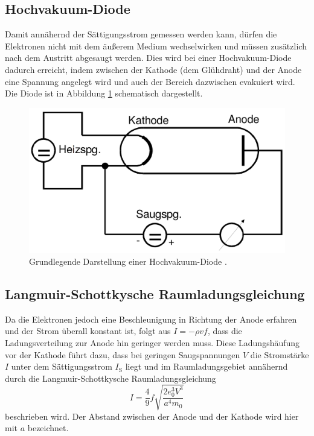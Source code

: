 \subsection{Hochvakuum-Diode}
Damit annähernd der Sättigungsstrom gemessen werden kann, dürfen die Elektronen nicht mit dem äußerem Medium wechselwirken und müssen zusätzlich nach dem Austritt abgesaugt werden. Dies wird bei einer Hochvakuum-Diode dadurch erreicht, indem zwischen der Kathode (dem Glühdraht) und der Anode eine Spannung angelegt wird und auch der Bereich dazwischen evakuiert wird. Die Diode ist in Abbildung \ref{fig:Hochvakuum-Diode} schematisch dargestellt.
\begin{figure}
	\centering
	\includegraphics[width=\linewidth-150pt,height=\textheight-150pt,keepaspectratio]{content/Bilder/Hochvakuum-Diode.png}
	\caption{Grundlegende Darstellung einer Hochvakuum-Diode \cite{V504}.}
	\label{fig:Hochvakuum-Diode}
\end{figure}

\subsection{Langmuir-Schottkysche Raumladungsgleichung}
Da die Elektronen jedoch eine Beschleunigung in Richtung der Anode erfahren und der Strom überall konstant ist, folgt aus $I = -\rho v f $, dass die Ladungsverteilung zur Anode hin geringer werden muss. Diese Ladungshäufung vor der Kathode führt dazu, dass bei geringen Saugspannungen $V$ die Stromstärke $I$ unter dem Sättigungsstrom $I_\text{S}$ liegt und im Raumladungsgebiet annähernd durch die Langmuir-Schottkysche Raumladungsgleichung 
\begin{equation}
	I = \frac{4}{9} f \sqrt{\frac{2 e_0^3 V^3}{a^4 m_0} } \label{eq:Langmuir-Schottkysche_Raumladungsgleichung}
\end{equation} 
beschrieben wird. Der Abstand zwischen der Anode und der Kathode wird hier mit $a$ bezeichnet.

